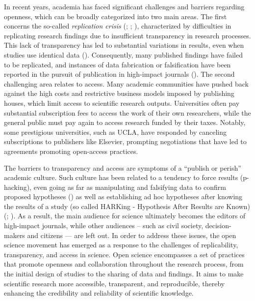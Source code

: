 \documentclass[
  letterpaper,
]{article}
\begin{document}
In recent years, academia has faced significant challenges and barriers
regarding openness, which can be broadly categorized into two main
areas. The first concerns the so-called \emph{replication crisis}
(;
;
), characterized by
difficulties in replicating research findings due to insufficient
transparency in research processes. This lack of transparency has led to
substantial variations in results, even when studies use identical data
(). Consequently, many
published findings have failed to be replicated, and instances of data
fabrication or falsification have been reported in the pursuit of
publication in high-impact journals
(). The
second challenging area relates to access. Many academic communities
have pushed back against the high costs and restrictive business models
imposed by publishing houses, which limit access to scientific research
outputs. Universities often pay substantial subscription fees to access
the work of their own researchers, while the general public must pay
again to access research funded by their taxes. Notably, some
prestigious universities, such as UCLA, have responded by canceling
subscriptions to publishers like Elsevier, prompting negotiations that
have led to agreements promoting open-access practices.

The barriers to transparency and access are symptoms of a ``publish or
perish'' academic culture. Such culture has been related to a tendency
to force results (p-hacking), even going as far as manipulating and
falsifying data to confirm proposed hypotheses
() as well as
establishing ad hoc hypotheses after knowing the results of a study (so
called HARKing - Hypothesis After Results are Known)
(;
). As a result, the main
audience for science ultimately becomes the editors of high-impact
journals, while other audiences -- such as civil society,
decision-makers and citizens --- are left out. In order to address these
issues, the open science movement has emerged as a response to the
challenges of replicability, transparency, and access in science. Open
science encompasses a set of practices that promote openness and
collaboration throughout the research process, from the initial design
of studies to the sharing of data and findings. It aims to make
scientific research more accessible, transparent, and reproducible,
thereby enhancing the credibility and reliability of scientific
knowledge.
\end{document}
